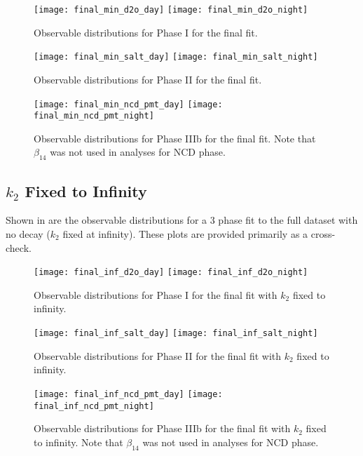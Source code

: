 \begin{figure}
\centering
\texttt{[image: final\_min\_d2o\_day]}
\texttt{[image: final\_min\_d2o\_night]}
\caption{\label{fig:final_d2o_obs}Observable distributions for Phase I for the final fit.}
\end{figure}
\begin{figure}
\centering
\texttt{[image: final\_min\_salt\_day]}
\texttt{[image: final\_min\_salt\_night]}
\caption{\label{fig:final_salt_obs}Observable distributions for Phase II for the final fit.}
\end{figure}
\begin{figure}
\centering
\texttt{[image: final\_min\_ncd\_pmt\_day]}
\texttt{[image: final\_min\_ncd\_pmt\_night]}
\caption{\label{fig:final_ncd_pmt_obs}Observable distributions for Phase IIIb for the final fit. Note that $\beta_{14}$ was not used in analyses for NCD phase.}
\end{figure}

\clearpage

\subsection{\texorpdfstring{$k_2$}{k2} Fixed to Infinity}

Shown in  are the observable distributions for a 3 phase fit to the full dataset with no decay ($k_2$ fixed at infinity). These plots are provided primarily as a cross-check.

\begin{figure}
\centering
\texttt{[image: final\_inf\_d2o\_day]}
\texttt{[image: final\_inf\_d2o\_night]}
\caption{\label{fig:final_inf_d2o_obs}Observable distributions for Phase I for the final fit with $k_2$ fixed to infinity.}
\end{figure}
\begin{figure}
\centering
\texttt{[image: final\_inf\_salt\_day]}
\texttt{[image: final\_inf\_salt\_night]}
\caption{\label{fig:final_inf_salt_obs}Observable distributions for Phase II for the final fit with $k_2$ fixed to infinity.}
\end{figure}
\begin{figure}
\centering
\texttt{[image: final\_inf\_ncd\_pmt\_day]}
\texttt{[image: final\_inf\_ncd\_pmt\_night]}
\caption{\label{fig:final_inf_ncd_pmt_obs}Observable distributions for Phase IIIb for the final fit with $k_2$ fixed to infinity. Note that $\beta_{14}$ was not used in analyses for NCD phase.}
\end{figure}
